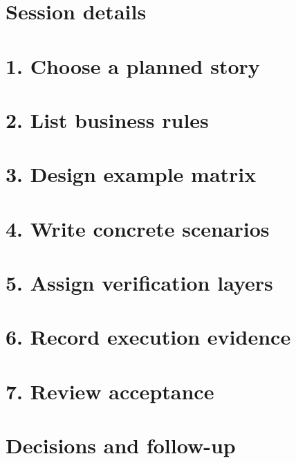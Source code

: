 \documentclass[11pt,letterpaper]{article}
\begin{document}
\section{Session details}
\section{1. Choose a planned story}
\section{2. List business rules}
\clearpage
\section{3. Design example matrix}
\section{4. Write concrete scenarios}
\clearpage
\section{5. Assign verification layers}
\section{6. Record execution evidence}
\clearpage
\section{7. Review acceptance}
\section{Decisions and follow-up}
\end{document}
